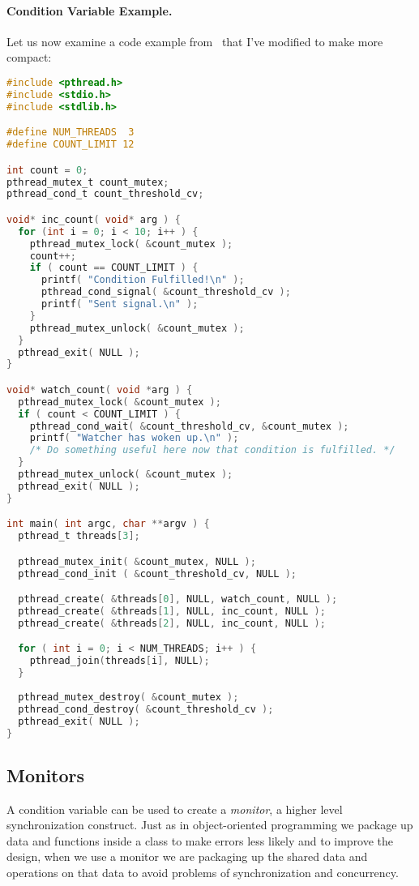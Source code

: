 \paragraph{Condition Variable Example.} Let us now examine a code example from~\cite{pthreads} that I've modified to make more compact:
\begin{lstlisting}[language=C]
#include <pthread.h>
#include <stdio.h>
#include <stdlib.h>

#define NUM_THREADS  3
#define COUNT_LIMIT 12

int count = 0;
pthread_mutex_t count_mutex;
pthread_cond_t count_threshold_cv;

void* inc_count( void* arg ) {
  for (int i = 0; i < 10; i++ ) {
    pthread_mutex_lock( &count_mutex );
    count++;
    if ( count == COUNT_LIMIT ) {
      printf( "Condition Fulfilled!\n" );
      pthread_cond_signal( &count_threshold_cv );
      printf( "Sent signal.\n" );
    }
    pthread_mutex_unlock( &count_mutex );
  }
  pthread_exit( NULL );
}

void* watch_count( void *arg ) {
  pthread_mutex_lock( &count_mutex );  
  if ( count < COUNT_LIMIT ) {
    pthread_cond_wait( &count_threshold_cv, &count_mutex );
    printf( "Watcher has woken up.\n" );
    /* Do something useful here now that condition is fulfilled. */
  }
  pthread_mutex_unlock( &count_mutex );
  pthread_exit( NULL );
}

int main( int argc, char **argv ) {
  pthread_t threads[3];

  pthread_mutex_init( &count_mutex, NULL );
  pthread_cond_init ( &count_threshold_cv, NULL );

  pthread_create( &threads[0], NULL, watch_count, NULL );
  pthread_create( &threads[1], NULL, inc_count, NULL );
  pthread_create( &threads[2], NULL, inc_count, NULL );

  for ( int i = 0; i < NUM_THREADS; i++ ) {
    pthread_join(threads[i], NULL);
  }
  
  pthread_mutex_destroy( &count_mutex );
  pthread_cond_destroy( &count_threshold_cv );
  pthread_exit( NULL );
}
\end{lstlisting}

\subsection*{Monitors}
A condition variable can be used to create a \textit{monitor}, a higher level synchronization construct. Just as in object-oriented programming we package up data and functions inside a class to make errors less likely and to improve the design, when we use a monitor we are packaging up the shared data and operations on that data to avoid problems of synchronization and concurrency.

